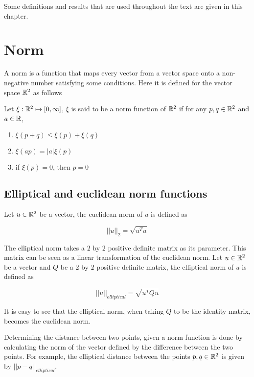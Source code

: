 Some definitions and results that are used throughout the text are given in this chapter.

\section{Norm}

A norm is a function that maps every vector from a vector space onto a non-negative number satisfying some conditions. Here it is defined for the vector space $\mathbb{R}^2$ as follows

\begin{definicao}
Let $\xi : \mathbb{R}^2 \mapsto [0, \infty]$, $\xi$ is said to be a norm function of $\mathbb{R}^2$ if for any $p, q \in \mathbb{R}^2$ and $a \in \mathbb{R}$,

\begin{enumerate}
    \item $\xi(p + q) \le \xi(p) + \xi(q)$
    \item $\xi(ap) = |a|\xi(p)$
    \item if $\xi(p)=0$, then $p=0$
\end{enumerate}

\end{definicao}

\subsection{Elliptical and euclidean norm functions}

Let $u \in \mathbb{R}^2$ be a vector, the euclidean norm of $u$ is defined as

\begin{equation}\label{eq:norm2}
||u||_2 = \sqrt{u^{T}u}
\end{equation}

The elliptical norm takes a $2$ by $2$ positive definite matrix as its parameter. This matrix can be seen as a linear transformation of the euclidean norm. Let $u \in \mathbb{R}^2$ be a vector and $Q$ be a $2$ by $2$ positive definite matrix, the elliptical norm of $u$ is defined as 

\begin{equation}
||u||_{elliptical} = \sqrt{u^{T}Qu}
\end{equation}

It is easy to see that the elliptical norm, when taking $Q$ to be the identity matrix, becomes the euclidean norm.

Determining the distance between two points, given a norm function is done by calculating the norm of the vector defined by the difference between the two points. For example, the elliptical distance between the points $p,q \in \mathbb{R}^2$ is given by $||p-q||_{elliptical}$.

